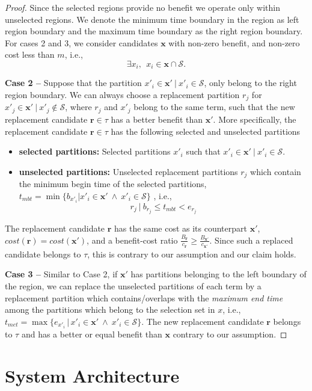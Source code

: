 \begin{proof}{}
Since the selected regions provide no benefit we operate only within unselected regions. We denote the minimum time boundary in the region as left region boundary and the maximum time boundary as the right region boundary.  
For cases 2 and 3, we consider candidates $\mathbf{x}$ with non-zero benefit, and non-zero cost less than $m$, i.e.,
$$\exists x_i, ~~x_i \in \mathbf{x} \cap \mathcal{S}. $$

{\bf Case 2 --} Suppose that the partition  $x'_i \in \mathbf{x'} ~|~ x'_i \in \mathcal{S}$, only belong to the right region boundary. We can always choose a replacement partition $r_j$ for $x'_j \in \mathbf{x'} ~|~ x'_j \notin \mathcal{S}$, where $r_j$ and $x'_j$ belong to the same term, such that the new replacement candidate $\mathbf{r} \in \tau$ has a better benefit than $\mathbf{x'}$. More specifically, the replacement candidate $\mathbf{r} \in \tau$ has the following selected and unselected partitions
\begin{itemize}
	\item {\bf selected partitions:} Selected partitions $x'_i $ such that $x'_i \in \mathbf{x'} ~|~ x'_i \in \mathcal{S}$. 
	\item {\bf unselected partitions:} Unselected replacement partitions $r_j$ which contain the minimum begin time of the selected partitions, $t_{mbt} = \min\{ b_{x'_i} | x'_i \in \mathbf{x'} ~\land~ x'_i \in \mathcal{S} \}$ , i.e.,
$$
  r_j ~|~ b_{r_j} \leq t_{mbt} < e_{r_j}
$$
 \end{itemize}
The replacement candidate $\mathbf{r}$ has the same cost as its counterpart $\mathbf{x'}$, $cost(\mathbf{r}) = cost(\mathbf{x'})$, and a benefit-cost ratio $\frac{B_\mathbf{r}}{c_\mathbf{r}} \geq \frac{B_\mathbf{x'}}{c_\mathbf{x'}}$. Since such a replaced candidate belongs to $\tau$, this is contrary to our assumption and our claim holds.

{\bf Case 3 -- } Similar to Case 2, if $\mathbf{x'}$ has partitions belonging to the left boundary of the region, we can replace the unselected partitions of each term by a replacement partition which contains/overlaps with the \emph{maximum end time} among the partitions which belong to the selection set in $x$, i.e., $t_{met} = \max\{ e_{x'_i}\,|\, x'_i \in \mathbf{x'} ~\land~ x'_i \in \mathcal{S} \}$. The new replacement candidate $\mathbf{r}$ belongs to $\tau$ and has a better or equal benefit than $\mathbf{x}$ contrary to our assumption.
\end{proof}

\section{System Architecture}


